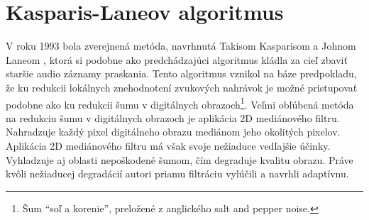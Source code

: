 \section{Kasparis-Laneov algoritmus}
V roku 1993 bola zverejnená metóda, navrhnutá Takisom Kasparisom a Johnom Laneom \cite{Kasparis}, ktorá si podobne ako predchádzajúci algoritmus kládla za cieľ zbaviť staršie audio záznamy praskania. Tento algoritmus vznikol na báze predpokladu, že ku redukcii lokálnych znehodnotení zvukových nahrávok je možné pristupovať podobne ako ku redukcii šumu v digitálnych obrazoch\footnote{Šum ``soľ a korenie'', preložené z anglického salt and pepper noise.}. Veľmi obľúbená metóda na redukciu šumu v digitálnych obrazoch je aplikácia 2D mediánového filtru. Nahradzuje každý pixel digitálneho obrazu mediánom jeho okolitých pixelov. Aplikácia 2D mediánového filtru má však svoje nežiaduce vedľajšie účinky. Vyhladzuje aj oblasti nepoškodené šumom, čím degraduje kvalitu obrazu. Práve kvôli nežiaducej degradácií autori priamu filtráciu vylúčili a navrhli adaptívnu.

